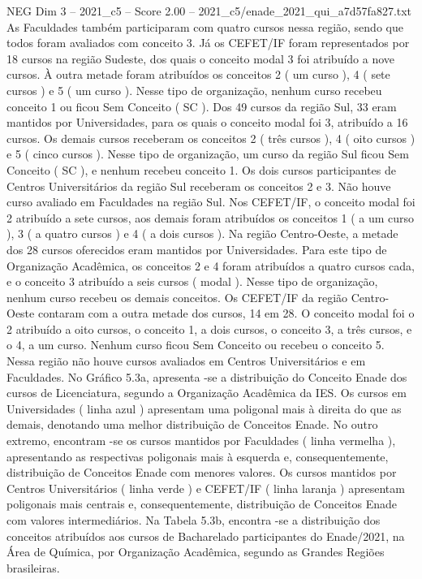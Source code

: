 \begin{textsample}{NEG Dim 3 – 2021\_c5 – Score 2.00 – 2021\_c5/enade\_2021\_qui\_a7d57fa827.txt}
As Faculdades também participaram com quatro cursos nessa região, sendo que todos foram avaliados com conceito 3.
Já os CEFET/IF foram representados por 18 cursos na região Sudeste, dos quais o conceito modal 3 foi atribuído a nove cursos.
À outra metade foram atribuídos os conceitos 2 ( um curso ), 4 ( sete cursos ) e 5 ( um curso ).
Nesse tipo de organização, nenhum curso recebeu conceito 1 ou ficou Sem Conceito ( SC ).
Dos 49 cursos da região Sul, 33 eram mantidos por Universidades, para os quais o conceito modal foi 3, atribuído a 16 cursos.
Os demais cursos receberam os conceitos 2 ( três cursos ), 4 ( oito cursos ) e 5 ( cinco cursos ).
Nesse tipo de organização, um curso da região Sul ficou Sem Conceito ( SC ), e nenhum recebeu conceito 1.
Os dois cursos participantes de Centros Universitários da região Sul receberam os conceitos 2 e 3.
Não houve curso avaliado em Faculdades na região Sul.
Nos CEFET/IF, o conceito modal foi 2 atribuído a sete cursos, aos demais foram atribuídos os conceitos 1 ( a um curso ), 3 ( a quatro cursos ) e 4 ( a dois cursos ).
Na região Centro-Oeste, a metade dos 28 cursos oferecidos eram mantidos por Universidades.
Para este tipo de Organização Acadêmica, os conceitos 2 e 4 foram atribuídos a quatro cursos cada, e o conceito 3 atribuído a seis cursos ( modal ).
Nesse tipo de organização, nenhum curso recebeu os demais conceitos.
Os CEFET/IF da região Centro-Oeste contaram com a outra metade dos cursos, 14 em 28.
O conceito modal foi o 2 atribuído a oito cursos, o conceito 1, a dois cursos, o conceito 3, a três cursos, e o 4, a um curso.
Nenhum curso ficou Sem Conceito ou recebeu o conceito 5.
Nessa região não houve cursos avaliados em Centros Universitários e em Faculdades.
No Gráfico 5.3a, apresenta -se a distribuição do Conceito Enade dos cursos de Licenciatura, segundo a Organização Acadêmica da IES.
Os cursos em Universidades ( linha azul ) apresentam uma poligonal mais à direita do que as demais, denotando uma melhor distribuição de Conceitos Enade.
No outro extremo, encontram -se os cursos mantidos por Faculdades ( linha vermelha ), apresentando as respectivas poligonais mais à esquerda e, consequentemente, distribuição de Conceitos Enade com menores valores.
Os cursos mantidos por Centros Universitários ( linha verde ) e CEFET/IF ( linha laranja ) apresentam poligonais mais centrais e, consequentemente, distribuição de Conceitos Enade com valores intermediários.
Na Tabela 5.3b, encontra -se a distribuição dos conceitos atribuídos aos cursos de Bacharelado participantes do Enade/2021, na Área de Química, por Organização Acadêmica, segundo as Grandes Regiões brasileiras.

\end{textsample}
